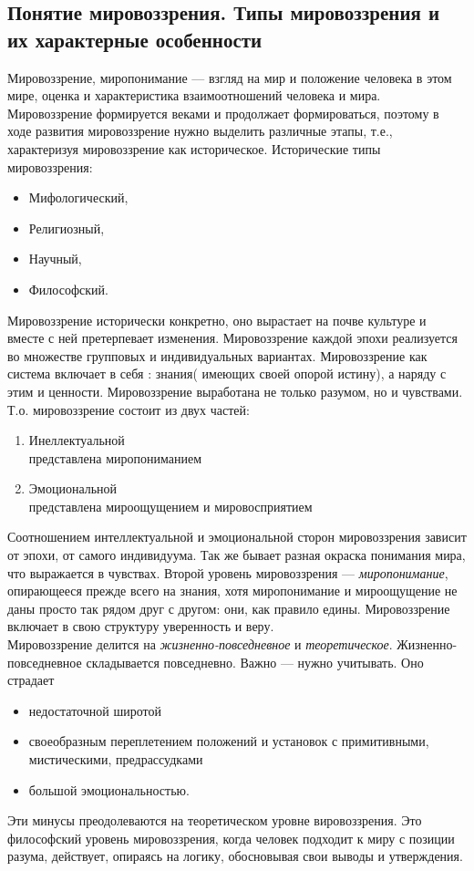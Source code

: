 \documentclass[12pt]{article}
\begin{document}
\subsection{Понятие мировоззрения. Типы мировоззрения и их характерные особенности}
Мировоззрение, миропонимание --- взгляд на мир и положение человека в этом мире, оценка и характеристика
взаимоотношений человека и мира. Мировоззрение формируется веками и продолжает формироваться, поэтому
в ходе развития мировоззрение нужно выделить различные этапы, т.е., характеризуя мировоззрение как историческое.
Исторические типы мировоззрения:
\begin{itemize}
\item Мифологический,
\item Религиозный,
\item Научный,
\item Философский.
\end{itemize}
Мировоззрение исторически конкретно, оно вырастает на почве культуре и вместе с ней претерпевает
изменения. Мировоззрение каждой эпохи реализуется во множестве групповых и индивидуальных вариантах.
Мировоззрение как система включает в себя : знания( имеющих своей опорой истину), а наряду с этим и ценности.
Мировоззрение выработана не только разумом, но и чувствами. 
Т.о. мировоззрение состоит из двух частей:
\begin{enumerate}
\item Инеллектуальной\\
	представлена миропониманием
\item Эмоциональной\\
	представлена мироощущением и мировосприятием
\end{enumerate}
Соотношением интеллектуальной и эмоциональной сторон мировоззрения зависит от эпохи, от самого индивидуума.
Так же бывает разная окраска понимания мира, что выражается в чувствах.
Второй уровень мировоззрения --- \textit{миропонимание}, опирающееся прежде всего
на знания, хотя миропонимание и мироощущение не даны просто так рядом друг с другом: они, как правило едины.
Мировоззрение включает в свою структуру уверенность и веру.\\
Мировоззрение делится на \textit{жизненно-повседневное} и \textit{теоретическое}.
Жизненно-повседневное складывается повседневно. Важно — нужно учитывать. Оно страдает
\begin{itemize}
\item недостаточной широтой
\item своеобразным переплетением положений и установок с примитивными, мистическими, предрассудками
\item большой эмоциональностью.
\end{itemize}
Эти минусы преодолеваются на теоретическом уровне вировоззрения. Это философский уровень мировоззрения,
когда человек подходит к миру с позиции разума, действует, опираясь на логику, обосновывая свои выводы и
утверждения.
\end{document}
